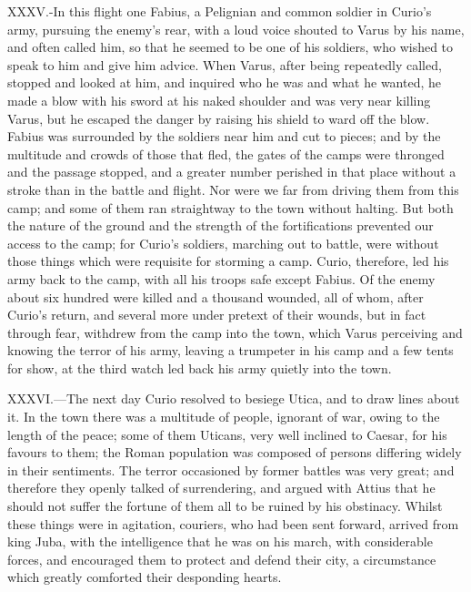 XXXV.-In this flight one Fabius, a Pelignian and common soldier in
Curio's army, pursuing the enemy's rear, with a loud voice shouted to
Varus by his name, and often called him, so that he seemed to be one of
his soldiers, who wished to speak to him and give him advice. When
Varus, after being repeatedly called, stopped and looked at him, and
inquired who he was and what he wanted, he made a blow with his sword at
his naked shoulder and was very near killing Varus, but he escaped the
danger by raising his shield to ward off the blow. Fabius was surrounded
by the soldiers near him and cut to pieces; and by the multitude and
crowds of those that fled, the gates of the camps were thronged and the
passage stopped, and a greater number perished in that place without a
stroke than in the battle and flight. Nor were we far from driving them
from this camp; and some of them ran straightway to the town without
halting. But both the nature of the ground and the strength of the
fortifications prevented our access to the camp; for Curio's soldiers,
marching out to battle, were without those things which were requisite
for storming a camp. Curio, therefore, led his army back to the camp,
with all his troops safe except Fabius. Of the enemy about six hundred
were killed and a thousand wounded, all of whom, after Curio's return,
and several more under pretext of their wounds, but in fact through
fear, withdrew from the camp into the town, which Varus perceiving and
knowing the terror of his army, leaving a trumpeter in his camp and a
few tents for show, at the third watch led back his army quietly into
the town.

XXXVI.—The next day Curio resolved to besiege Utica, and to draw lines
about it. In the town there was a multitude of people, ignorant of war,
owing to the length of the peace; some of them Uticans, very well
inclined to Caesar, for his favours to them; the Roman population was
composed of persons differing widely in their sentiments. The terror
occasioned by former battles was very great; and therefore they openly
talked of surrendering, and argued with Attius that he should not suffer
the fortune of them all to be ruined by his obstinacy. Whilst these
things were in agitation, couriers, who had been sent forward, arrived
from king Juba, with the intelligence that he was on his march, with
considerable forces, and encouraged them to protect and defend their
city, a circumstance which greatly comforted their desponding hearts.

